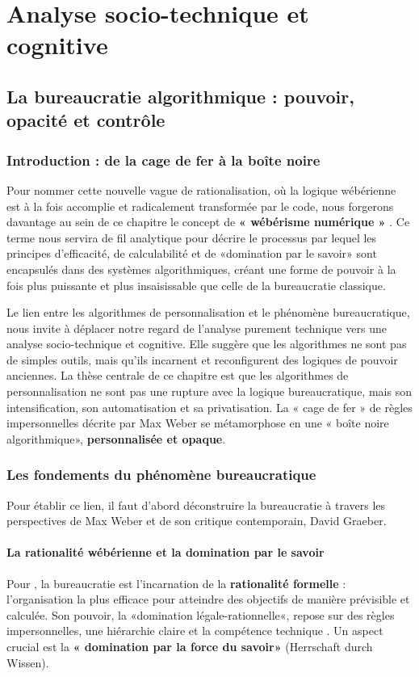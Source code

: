 \part{Analyse socio-technique et cognitive}
\chapter{La bureaucratie algorithmique : pouvoir, opacité et contrôle}
\label{chap:bureaucratie}

\section{Introduction : de la cage de fer à la boîte noire}
Pour nommer cette nouvelle vague de rationalisation, où la logique wébérienne est à la fois accomplie et radicalement transformée par le code, nous forgerons davantage au sein de ce chapitre le concept de \textbf{« wébérisme numérique »} \citet{Muellerleile2018Digital}. Ce terme nous servira de fil analytique pour décrire le processus par lequel les principes d'efficacité, de calculabilité et de «domination par le savoir» sont encapsulés dans des systèmes algorithmiques, créant une forme de pouvoir à la fois plus puissante et plus insaisissable que celle de la bureaucratie classique.

Le lien entre les algorithmes de personnalisation et le phénomène bureaucratique, nous invite à déplacer notre regard de l'analyse purement technique vers une analyse socio-technique et cognitive. Elle suggère que les algorithmes ne sont pas de simples outils, mais qu'ils incarnent et reconfigurent des logiques de pouvoir anciennes. La thèse centrale de ce chapitre est que les algorithmes de personnalisation ne sont pas une rupture avec la logique bureaucratique, mais son intensification, son automatisation et sa privatisation. La « cage de fer » de règles impersonnelles décrite par Max Weber se métamorphose en une « boîte noire algorithmique», \textbf{personnalisée et opaque}.

\section{Les fondements du phénomène bureaucratique}

Pour établir ce lien, il faut d'abord déconstruire la bureaucratie à travers les perspectives de Max Weber et de son critique contemporain, David Graeber.

\subsection{La rationalité wébérienne et la domination par le savoir}
Pour \citet{Weber1927Wirtschaft}, la bureaucratie est l'incarnation de la \textbf{rationalité formelle} : l'organisation la plus efficace pour atteindre des objectifs de manière prévisible et calculée. Son pouvoir, la «domination légale-rationnelle«, repose sur des règles impersonnelles, une hiérarchie claire et la compétence technique \citep{Serpa2019}. Un aspect crucial est la \textbf{« domination par la force du savoir»} (Herrschaft durch Wissen). 

